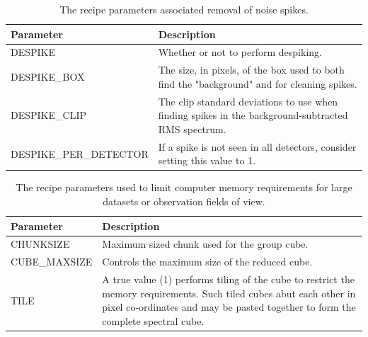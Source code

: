 \documentclass[11pt,oneside,chapters]{starlink}
\begin{document}
\begin{table}[h!]
\begin{small}
\begin{tabular}{|p{6.8cm}|p{8.6cm}|}
\hline
\textbf{Parameter} & \textbf{Description} \\
\hline
DESPIKE & Whether or not to perform despiking.\\
DESPIKE\_BOX & The size, in pixels, of the box used to both find the "background" and
               for cleaning spikes.\\
DESPIKE\_CLIP & The clip standard deviations to use when finding spikes in the
                background-subtracted RMS spectrum.\\
DESPIKE\_PER\_DETECTOR & If a spike is not seen in all detectors, consider setting this
                         value to 1.\\
\hline
\end{tabular}
\end{small}
\caption{\label{tab:despike_params}
  The recipe parameters associated removal of noise spikes.}
\end{table}

\begin{table}[h!]
\begin{small}
\begin{tabular}{|p{6.8cm}|p{8.6cm}|}
\hline
\textbf{Parameter} & \textbf{Description} \\
\hline
CHUNKSIZE & Maximum sized chunk used for the group cube.\\
CUBE\_MAXSIZE & Controls the maximum size of the reduced cube. \\
\hline
TILE & A true value (1) performs tiling of the cube to restrict the memory requirements.
       Such tiled cubes abut each other in pixel co-ordinates and may be pasted together
       to form the complete spectral cube. \\
\hline
\end{tabular}
\end{small}
\caption{\label{tab:largedata_params}
  The recipe parameters used to limit computer memory requirements for large
  datasets or observation fields of view.}
\end{table}
\end{document}
